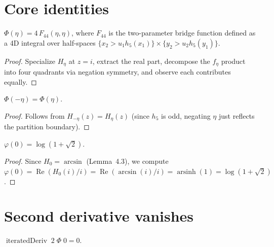 \section{Core identities}

\begin{lemma}[$\Phi = 4 F_{44}$ on the diagonal]
  \label{lem:Phi_eq_F44_diag}
  \leanok
  $\Phi(\eta) = 4\,F_{44}(\eta, \eta)$, where $F_{44}$ is the two-parameter bridge function
  defined as a 4D integral over half-spaces $\{x_2 > u_1 h_5(x_1)\} \times \{y_2 > u_2 h_5(y_1)\}$.
\end{lemma}

\begin{proof}
  \leanok
  Specialize $H_\eta$ at $z = i$, extract the real part, decompose the $f_\eta$ product
  into four quadrants via negation symmetry, and observe each contributes equally.
\end{proof}

\begin{lemma}
  \label{lem:Phi_even}
  \leanok
  $\Phi(-\eta) = \Phi(\eta)$.
\end{lemma}

\begin{proof}
  \leanok
  Follows from $H_{-\eta}(z) = H_\eta(z)$ (since $h_5$ is odd, negating $\eta$ just
  reflects the partition boundary).
\end{proof}

\begin{lemma}[$\varphi(0) = \log(1+\sqrt{2})$]
  \label{lem:varphi_zero}
  \leanok
  $\varphi(0) = \log(1 + \sqrt{2})$.
\end{lemma}

\begin{proof}
  \leanok
  Since $H_0 = \arcsin$ (Lemma~4.3), we compute
  $\varphi(0) = \operatorname{Re}(H_0(i)/i) = \operatorname{Re}(\arcsin(i)/i) = \operatorname{arsinh}(1) = \log(1+\sqrt{2})$.
\end{proof}

\section{Second derivative vanishes}

\begin{lemma}[$\Phi''(0) = 0$]
  \label{lem:Phi_second_deriv_zero}
  \leanok
  $\operatorname{iteratedDeriv}\;2\;\Phi\;0 = 0$.
\end{lemma}

